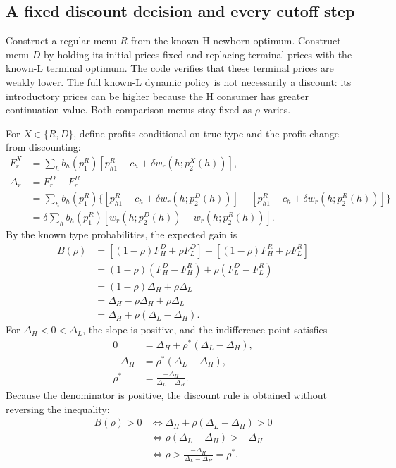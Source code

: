 \documentclass[12pt]{article}
\theoremstyle{definition}
\theoremstyle{remark}
\numberwithin{equation}{section}
\begin{document}
\subsection{A fixed discount decision and every cutoff step}
Construct a regular menu $R$ from the known-H newborn optimum. Construct menu
$D$ by holding its initial prices fixed and replacing terminal prices with the
known-L terminal optimum. The code verifies that these terminal prices are
weakly lower. The full known-L dynamic policy is not necessarily a discount:
its introductory prices can be higher because the H consumer has greater
continuation value. Both comparison menus stay fixed as $\rho$ varies.

For $X\in\{R,D\}$, define profits conditional on true type and the profit
change from discounting:
\begin{align}
 F_r^X&=\sum_h b_h(p_1^R)
      [p_{h1}^R-c_h+\delta w_r(h;p_2^X(h))],\\
 \Delta_r&=F_r^D-F_r^R\\
 &=\sum_hb_h(p_1^R)\{[p_{h1}^R-c_h+\delta w_r(h;p_2^D(h))]
                         -[p_{h1}^R-c_h+\delta w_r(h;p_2^R(h))]\}\\
 &=\delta\sum_hb_h(p_1^R)
                         [w_r(h;p_2^D(h))-w_r(h;p_2^R(h))].
\end{align}
By the known type probabilities, the expected gain is
\begin{align}
 B(\rho)&=[(1-\rho)F_H^D+\rho F_L^D]
                         -[(1-\rho)F_H^R+\rho F_L^R]\\
 &=(1-\rho)(F_H^D-F_H^R)+\rho(F_L^D-F_L^R)\\
 &=(1-\rho)\Delta_H+\rho\Delta_L\\
 &=\Delta_H-\rho\Delta_H+\rho\Delta_L\\
 &=\Delta_H+\rho(\Delta_L-\Delta_H).
\end{align}
For $\Delta_H<0<\Delta_L$, the slope is positive, and the indifference point
satisfies
\begin{align}
 0&=\Delta_H+\rho^*(\Delta_L-\Delta_H),\\
 -\Delta_H&=\rho^*(\Delta_L-\Delta_H),\\
 \rho^*&=\frac{-\Delta_H}{\Delta_L-\Delta_H}.
\end{align}
Because the denominator is positive, the discount rule is obtained without
reversing the inequality:
\begin{align}
 B(\rho)>0
 &\iff\Delta_H+\rho(\Delta_L-\Delta_H)>0\\
 &\iff\rho(\Delta_L-\Delta_H)>-\Delta_H\\
 &\iff\rho>\frac{-\Delta_H}{\Delta_L-\Delta_H}=\rho^*.
\end{align}
\end{document}
